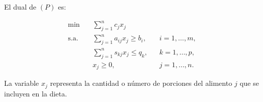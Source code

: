 El dual de $(P)$ es:

\[
\begin{aligned}
\min \quad &
\sum_{j=1}^{n} c_j x_j\\[2mm]
\text{s.a.}\quad &
\sum_{j=1}^{n} a_{ij}x_j \ge b_i,
&& i=1,\ldots,m,\\[2mm]
&
\sum_{j=1}^{n} s_{kj}x_j \le q_k,
&& k=1,\ldots,p,\\[2mm]
&
x_j\ge 0,
&& j=1,\ldots,n.
\end{aligned}
\]

La variable $x_j$ representa la cantidad o número de porciones del alimento $j$ que se incluyen en la dieta.

